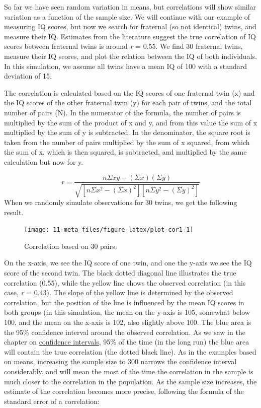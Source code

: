 \documentclass[
  oneside]{book}
\begin{document}
So far we have seen random variation in means, but correlations will show similar variation as a function of the sample size. We will continue with our example of measuring IQ scores, but now we search for fraternal (so not identical) twins, and measure their IQ. Estimates from the literature suggest the true correlation of IQ scores between fraternal twins is around \emph{r} = 0.55. We find 30 fraternal twins, measure their IQ scores, and plot the relation between the IQ of both individuals. In this simulation, we assume all twins have a mean IQ of 100 with a standard deviation of 15.

The correlation is calculated based on the IQ scores of one fraternal twin (x) and the IQ scores of the other fraternal twin (y) for each pair of twins, and the total number of pairs (N). In the numerator of the formula, the number of pairs is multiplied by the sum of the product of x and y, and from this value the sum of x multiplied by the sum of y is subtracted. In the denominator, the square root is taken from the number of pairs multiplied by the sum of x squared, from which the sum of x, which is then squared, is subtracted, and multiplied by the same calculation but now for y.

\[r=\frac{n \Sigma x y-(\Sigma x )(\Sigma y)}{\sqrt{[n \Sigma x^{2}-(\Sigma x)^{2}][n \Sigma y^{2}-(\Sigma y)^{2}]}}\]
When we randomly simulate observations for 30 twins, we get the following result.

\begin{figure}

{\centering \texttt{[image: 11-meta\_files/figure-latex/plot-cor1-1]} 

}

\caption{Correlation based on 30 pairs.}\label{fig:plot-cor1}
\end{figure}

On the x-axis, we see the IQ score of one twin, and one the y-axis we see the IQ score of the second twin. The black dotted diagonal line illustrates the true correlation (0.55), while the yellow line shows the observed correlation (in this case, \emph{r} = 0.43). The slope of the yellow line is determined by the observed correlation, but the position of the line is influenced by the mean IQ scores in both groups (in this simulation, the mean on the y-axis is 105, somewhat below 100, and the mean on the x-axis is 102, also slightly above 100. The blue area is the 95\% confidence interval around the observed correlation. As we saw in the chapter on \protect\hyperlink{confint}{confidence intervals}, 95\% of the time (in the long run) the blue area will contain the true correlation (the dotted black line). As in the examples based on means, increasing the sample size to 300 narrows the confidence interval considerably, and will mean the most of the time the correlation in the sample is much closer to the correlation in the population. As the sample size increases, the estimate of the correlation becomes more precise, following the formula of the standard error of a correlation:
\end{document}
